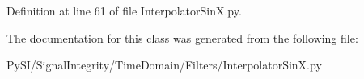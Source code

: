 Definition at line 61 of file Interpolator\+Sin\+X.\+py.



The documentation for this class was generated from the following file\+:\begin{DoxyCompactItemize}
\item 
Py\+S\+I/\+Signal\+Integrity/\+Time\+Domain/\+Filters/Interpolator\+Sin\+X.\+py\end{DoxyCompactItemize}
